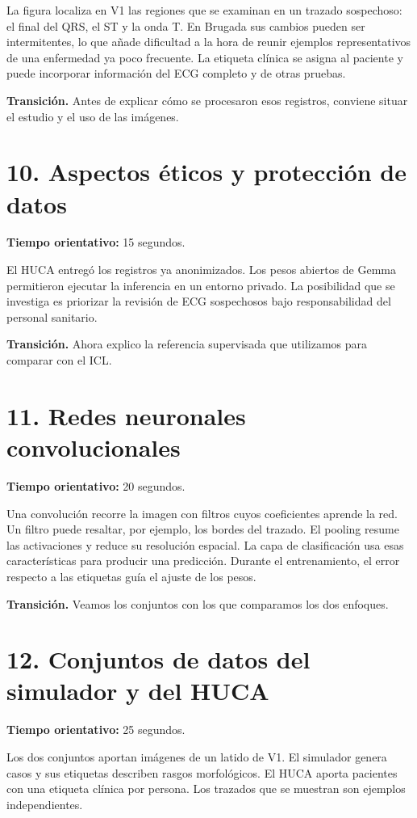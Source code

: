 \documentclass[11pt,a4paper]{article}
\begin{document}
La figura localiza en V1 las regiones que se examinan en un trazado sospechoso: el final del QRS, el ST y la onda T. En Brugada sus cambios pueden ser intermitentes, lo que añade dificultad a la hora de reunir ejemplos representativos de una enfermedad ya poco frecuente. La etiqueta clínica se asigna al paciente y puede incorporar información del ECG completo y de otras pruebas.

\textbf{Transición.} Antes de explicar cómo se procesaron esos registros, conviene situar el estudio y el uso de las imágenes.

\section*{10. Aspectos éticos y protección de datos}
\textbf{Tiempo orientativo: }15 segundos.

El HUCA entregó los registros ya anonimizados. Los pesos abiertos de Gemma permitieron ejecutar la inferencia en un entorno privado. La posibilidad que se investiga es priorizar la revisión de ECG sospechosos bajo responsabilidad del personal sanitario.

\textbf{Transición.} Ahora explico la referencia supervisada que utilizamos para comparar con el ICL.

\section*{11. Redes neuronales convolucionales}
\textbf{Tiempo orientativo: }20 segundos.

Una convolución recorre la imagen con filtros cuyos coeficientes aprende la red. Un filtro puede resaltar, por ejemplo, los bordes del trazado. El pooling resume las activaciones y reduce su resolución espacial. La capa de clasificación usa esas características para producir una predicción. Durante el entrenamiento, el error respecto a las etiquetas guía el ajuste de los pesos.

\textbf{Transición.} Veamos los conjuntos con los que comparamos los dos enfoques.

\section*{12. Conjuntos de datos del simulador y del HUCA}
\textbf{Tiempo orientativo: }25 segundos.

Los dos conjuntos aportan imágenes de un latido de V1. El simulador genera \SimPatients{} casos y sus etiquetas describen rasgos morfológicos. El HUCA aporta \HucaPatients{} pacientes con una etiqueta clínica por persona. Los trazados que se muestran son ejemplos independientes.
\end{document}
